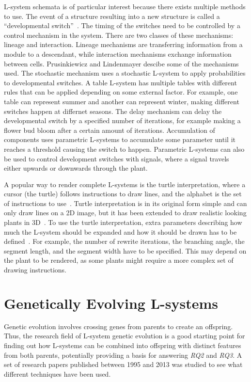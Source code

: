 L-system schemata is of particular interest because there exists multiple methods to use.
The event of a structure resulting into a new structure is called a ``developmental switch''~\cite{Prusinkiewicz2012}.
The timing of the switches need to be controlled by a control mechanism in the system.
There are two classes of these mechanisms: lineage and interaction.
Lineage mechanisms are transferring information from a module to a descendant, while interaction mechanisms exchange information between cells.
Prusinkiewicz and Lindenmayer descibe some of the mechanisms used.
The stochastic mechanism uses a stochastic L-system to apply probabilities to developmental switches.
A table L-system has multiple tables with different rules that can be applied depending on some external factor.
For example, one table can represent summer and another can represent winter, making different switches happen at differnet seasons.
The delay mechanism can delay the developmental switch by a specified number of iterations, for example making a flower bud bloom after a certain amount of iterations.
Accumulation of components uses parametric L-systems to accumulate some parameter until it reaches a threshold causing the switch to happen.
Parametric L-systems can also be used to control development switches with signals, where a signal travels either upwards or downwards through the plant.~\cite{Prusinkiewicz2012}

A popular way to render complete L-systems is the turtle interpretation, where a cursor (the turtle) follows instructions to draw lines, and the alphabet is the set of instructions to use~\cite{Prusinkiewicz2012}.
Turtle interpretation is in its original form simple and can only draw lines on a 2D image, but it has been extended to draw realistic looking plants in 3D~\cite{Prusinkiewicz1988}.
To use the turtle interpretation, extra parameters describing how much the L-system should be expanded and how it should be drawn has to be defined~\cite{Prusinkiewicz2012}.
For example, the number of rewrite iterations, the branching angle, the segment length, and the segment width have to be specified.
This may depend on the plant to be rendered, as some plants might require a more complex set of drawing instructions.

\section{Genetically Evolving L-systems}
Genetic evolution involves crossing genes from parents to create an offspring.
Thus, the research field of L-system genetic evolution is a good starting point for finding out how L-systems can be combined into offspring with distinct features from both parents, potentially providing a basis for answering \textit{RQ2} and \textit{RQ3}.
A set of research papers published between 1995 and 2013 was studied to see what different techniques have been used.

